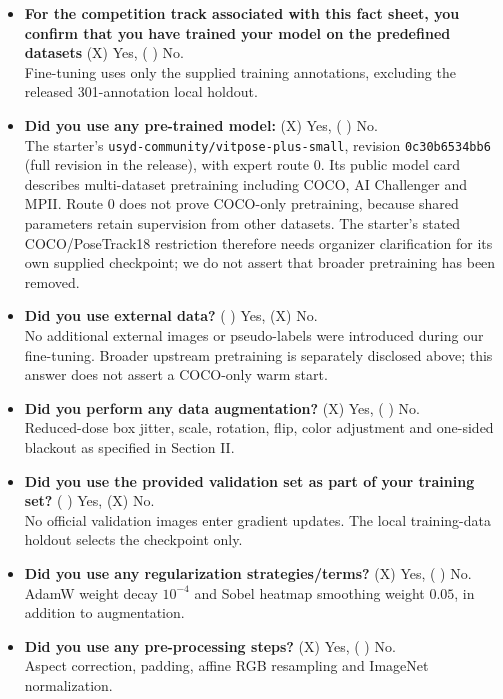 \documentclass[a4paper,10pt,conference]{ieeeconf}
\begin{document}
\begin{itemize}
\item \textbf{For the competition track associated with this fact sheet, you confirm that you have trained your model on the predefined datasets} (X) Yes, ( ) No.\\
Fine-tuning uses only the supplied training annotations, excluding the released 301-annotation local holdout.

\item \textbf{Did you use any pre-trained model:} (X) Yes, ( ) No.\\
The starter's \nolinkurl{usyd-community/vitpose-plus-small}, revision \texttt{0c30b6534bb6} (full revision in the release), with expert route 0. Its public model card describes multi-dataset pretraining including COCO, AI Challenger and MPII. Route 0 does not prove COCO-only pretraining, because shared parameters retain supervision from other datasets. The starter's stated COCO/PoseTrack18 restriction therefore needs organizer clarification for its own supplied checkpoint; we do not assert that broader pretraining has been removed.

\item \textbf{Did you use external data?} ( ) Yes, (X) No.\\
No additional external images or pseudo-labels were introduced during our fine-tuning. Broader upstream pretraining is separately disclosed above; this answer does not assert a COCO-only warm start.

\item \textbf{Did you perform any data augmentation?} (X) Yes, ( ) No.\\
Reduced-dose box jitter, scale, rotation, flip, color adjustment and one-sided blackout as specified in Section II.

\item \textbf{Did you use the provided validation set as part of your training set?} ( ) Yes, (X) No.\\
No official validation images enter gradient updates. The local training-data holdout selects the checkpoint only.

\item \textbf{Did you use any regularization strategies/terms?} (X) Yes, ( ) No.\\
AdamW weight decay $10^{-4}$ and Sobel heatmap smoothing weight $0.05$, in addition to augmentation.

\item \textbf{Did you use any pre-processing steps?} (X) Yes, ( ) No.\\
Aspect correction, padding, affine RGB resampling and ImageNet normalization.


\end{itemize}
\end{document}
